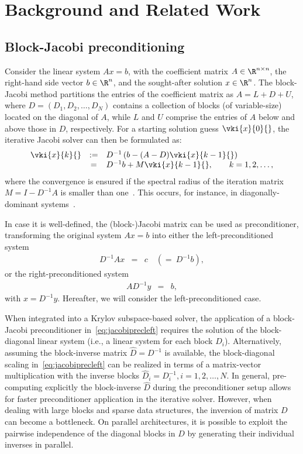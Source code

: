 \section{Background and Related Work}
\label{sec:s2-background}

\subsection{Block-Jacobi preconditioning}

Consider the linear system
$A x = b$, 
with the coefficient matrix $A\in \R^{n \times n}$, 
the right-hand side vector
$b\in \R^{n}$, 
and the sought-after solution
$x\in \R^{n}$. 
The block-Jacobi method partitions the entries of the
coefficient matrix as $A=L+D+U$,
where $D=(D_1,D_2,\ldots,D_N)$ contains a collection of blocks (of
variable-size) located on the diagonal of $A$,
while $L$ and $U$ comprise the entries of $A$ below and above those in $D$, respectively.
For a starting solution guess $\vki{x}{0}{}$, 
the iterative Jacobi solver can then be formulated as:
\begin{equation}
\begin{array}{rcl}
\vki{x}{k}{} &:=& D^{-1}\left(b-(A-D)\vki{x}{k-1}{}\right)\\
\label{eq:jacobirelax}
&=& D^{-1}b + M \vki{x}{k-1}{},
\qquad k=1,2,\ldots,
\end{array}
\end{equation}
where the convergence is ensured if the spectral radius of the iteration matrix $M=I-D^{-1}A$ 
is smaller than one~\cite{saad}.
This occurs, for instance, in diagonally-dominant systems~\cite{saad}.

In case it is well-defined, the \mbox{(block-)Jacobi} matrix can be used as preconditioner, 
transforming the original system $Ax=b$ into either the left-preconditioned system
\begin{eqnarray}
D^{-1}Ax&=& c \quad (=~D^{-1}b),
\label{eq:jacobiprecleft}
\end{eqnarray}
or the right-preconditioned system
\begin{eqnarray}
AD^{-1}y&=& b, 
\label{eq:jacobiprecright}
\end{eqnarray}
with $x = D^{-1}y$. {Hereafter, we will consider the left-preconditioned case.}

When integrated into a Krylov subspace-based solver, 
the application of a block-Jacobi preconditioner in~\eqref{eq:jacobiprecleft}
requires the solution of the block-diagonal linear system (i.e., a linear system
for each block $D_i$).
Alternatively, 
assuming the block-inverse matrix $\hat{D}=D^{-1}$
is available, the block-diagonal scaling in~\eqref{eq:jacobiprecleft}
can be realized in terms of a matrix-vector multiplication with the inverse blocks
$\hat{D}_i=D_i^{-1}, i=1,2,\dots,N$.
In general, pre-computing explicitly the block-inverse $\hat{D}$ during the preconditioner setup 
allows for faster preconditioner application in the iterative solver.
However, when dealing with large blocks and 
sparse data structures, 
the inversion of matrix $D$ can become a bottleneck. 
On parallel architectures, it is possible to exploit the pairwise independence of the diagonal blocks in $D$
by generating their individual inverses in parallel.

